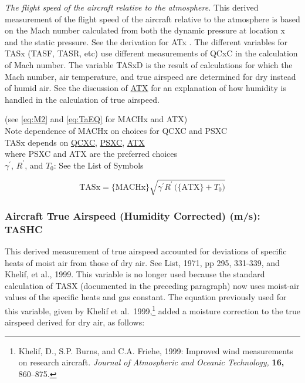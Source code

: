 \documentclass[
]{book}
\begin{document}
\emph{The flight speed of the aircraft relative to the atmosphere.} This derived measurement of the flight speed of the aircraft relative to the atmosphere is based on the Mach number calculated from both the dynamic pressure at location x and the static pressure. See the derivation for ATx . The different variables for TASx (TASF, TASR, etc) use different measurements of QCxC in the calculation of Mach number. The variable TASxD is the result of calculations for which the Mach number, air temperature, and true airspeed are determined for dry instead of humid air. See the discussion of \protect\hyperlink{ATX}{ATX} for an explanation of how humidity is handled in the calculation of true airspeed.

(see \eqref{eq:M2} and \eqref{eq:TaEQ} for MACHx and ATX)\\
Note dependence of MACHx on choices for QCXC and PSXC\\
TASx depends on \protect\hyperlink{qcx}{QCXC}, \protect\hyperlink{psx}{PSXC}, \href{ambient-t}{ATX}\\
\hspace*{0.333em}\hspace*{0.333em}\hspace*{0.333em}\hspace*{0.333em}\hspace*{0.333em}where PSXC and ATX are the preferred choices\\
\(\gamma^{\prime}\), \(R^{\prime}\), and \(T_{0}\): See the List of Symbols

\begin{equation}
\mathrm{TASx}=\mathrm{\{MACHx\}}\sqrt{\gamma^{\prime}R^{\prime}\mathrm{\,(\{ATX\}}+T_{0})}
\label{eq:TASx}
\end{equation}

\hypertarget{tashc}{%
\subsubsection*{Aircraft True Airspeed (Humidity Corrected) (m/s): TASHC}\label{tashc}}

This derived measurement of true airspeed accounted for deviations of specific heats of moist air from those of dry air. See List, 1971, pp 295, 331-339, and Khelif, et al., 1999. This variable is no longer used because the standard
calculation of TASX (documented in the preceding paragraph) now uses moist-air
values of the specific heats and gas constant. The equation previously used for this variable, given by Khelif et al.~1999,\footnote{Khelif, D., S.P. Burns, and C.A. Friehe, 1999: Improved wind measurements on research aircraft. \emph{Journal of Atmospheric and Oceanic Technology,} \textbf{16,} 860--875.}
added a moisture correction to the true airspeed derived for dry air, as follows:
\end{document}
